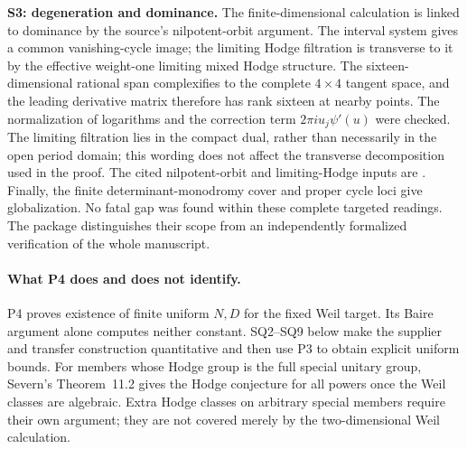 \textbf{S3: degeneration and dominance.}
The finite-dimensional calculation is linked to dominance by the source's nilpotent-orbit argument. The interval system gives a common vanishing-cycle image; the limiting Hodge filtration is transverse to it by the effective weight-one limiting mixed Hodge structure. The sixteen-dimensional rational span complexifies to the complete $4\times4$ tangent space, and the leading derivative matrix therefore has rank sixteen at nearby points. The normalization of logarithms and the correction term $2\pi i u_j\psi'(u)$ were checked. The limiting filtration lies in the compact dual, rather than necessarily in the open period domain; this wording does not affect the transverse decomposition used in the proof. The cited nilpotent-orbit and limiting-Hodge inputs are \citet[Theorems~4.12 and 6.16, printed pp.~233 and 255]{Schmid73}. Finally, the finite determinant-monodromy cover and proper cycle loci give globalization. No fatal gap was found within these complete targeted readings. The package distinguishes their scope from an independently formalized verification of the whole manuscript.

\paragraph{What P4 does and does not identify.}
P4 proves existence of finite uniform $N,D$ for the fixed Weil target. Its Baire argument alone computes neither constant. SQ2--SQ9 below make the supplier and transfer construction quantitative and then use P3 to obtain explicit uniform bounds. For members whose Hodge group is the full special unitary group, Severn's Theorem~11.2 gives the Hodge conjecture for all powers once the Weil classes are algebraic. Extra Hodge classes on arbitrary special members require their own argument; they are not covered merely by the two-dimensional Weil calculation.



